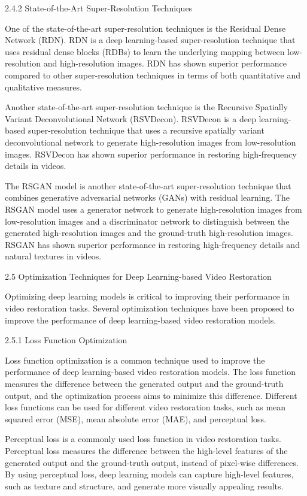 2.4.2 State-of-the-Art Super-Resolution Techniques

One of the state-of-the-art super-resolution techniques is the Residual Dense Network (RDN). RDN is a deep learning-based super-resolution technique that uses residual dense blocks (RDBs) to learn the underlying mapping between low-resolution and high-resolution images. RDN has shown superior performance compared to other super-resolution techniques in terms of both quantitative and qualitative measures.

Another state-of-the-art super-resolution technique is the Recursive Spatially Variant Deconvolutional Network (RSVDecon). RSVDecon is a deep learning-based super-resolution technique that uses a recursive spatially variant deconvolutional network to generate high-resolution images from low-resolution images. RSVDecon has shown superior performance in restoring high-frequency details in videos.

The RSGAN model is another state-of-the-art super-resolution technique that combines generative adversarial networks (GANs) with residual learning. The RSGAN model uses a generator network to generate high-resolution images from low-resolution images and a discriminator network to distinguish between the generated high-resolution images and the ground-truth high-resolution images. RSGAN has shown superior performance in restoring high-frequency details and natural textures in videos.

2.5 Optimization Techniques for Deep Learning-based Video Restoration

Optimizing deep learning models is critical to improving their performance in video restoration tasks. Several optimization techniques have been proposed to improve the performance of deep learning-based video restoration models.

2.5.1 Loss Function Optimization

Loss function optimization is a common technique used to improve the performance of deep learning-based video restoration models. The loss function measures the difference between the generated output and the ground-truth output, and the optimization process aims to minimize this difference. Different loss functions can be used for different video restoration tasks, such as mean squared error (MSE), mean absolute error (MAE), and perceptual loss.

Perceptual loss is a commonly used loss function in video restoration tasks. Perceptual loss measures the difference between the high-level features of the generated output and the ground-truth output, instead of pixel-wise differences. By using perceptual loss, deep learning models can capture high-level features, such as texture and structure, and generate more visually appealing results.

